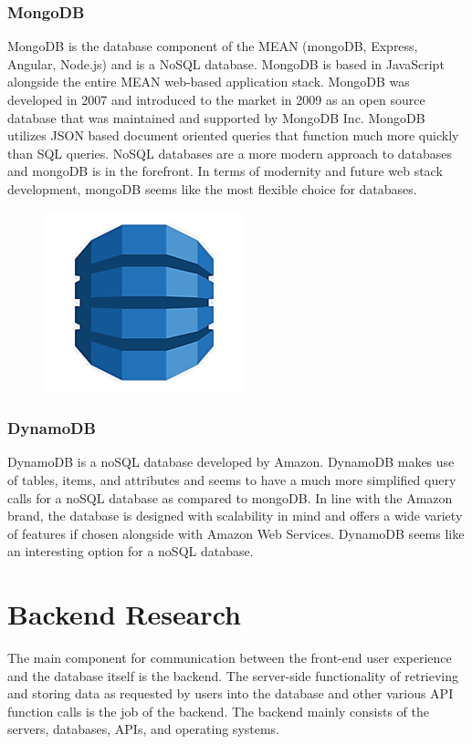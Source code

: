 \documentclass[12pt]{article}
\begin{document}
\subsubsection{MongoDB}

MongoDB is the database component of the MEAN (mongoDB, Express, Angular, Node.js) and is a NoSQL database.  MongoDB is based in JavaScript alongside the entire MEAN web-based application stack.  MongoDB was developed in 2007 and introduced to the market in 2009 as an open source database that was maintained and supported by MongoDB Inc.\cite{mongodb}  MongoDB utilizes JSON based document oriented queries that function much more quickly than SQL queries.  NoSQL databases are a more modern approach to databases and mongoDB is in the forefront.  In terms of modernity and future web stack development, mongoDB seems like the most flexible choice for databases.

\begin{figure}[h]
	\centering
	\includegraphics[width=0.251\linewidth]{dynamodb}
\end{figure}

\subsubsection{DynamoDB}

DynamoDB is a noSQL database developed by Amazon.  DynamoDB makes use of tables, items, and attributes and seems to have a much more simplified query calls for a noSQL database as compared to mongoDB.  In line with the Amazon brand, the database is designed with scalability in mind and offers a wide variety of features if chosen alongside with Amazon Web Services.\cite{dynamodb}  DynamoDB seems like an interesting option for a noSQL database.

\section{Backend Research}

The main component for communication between the front-end user experience and the database itself is the backend.  The server-side functionality of retrieving and storing data as requested by users into the database and other various API function calls is the job of the backend.  The backend mainly consists of the servers, databases, APIs, and operating systems.
\end{document}
